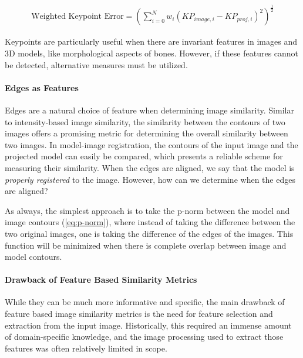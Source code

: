 \begin{equation}
    \begin{aligned}
        \text{Weighted Keypoint Error} = (\sum_{i = 0}^{N}w_{i}(KP_{image,i} - KP_{proj,i})^2)^{\frac{1}{2}}
    \end{aligned}
    \label{eq:wkp-error}
\end{equation}

Keypoints are particularly useful when there are invariant features in images and 3D models, like morphological aspects of bones.
However, if these features cannot be detected, alternative measures must be utilized.

\paragraph*{Edges as Features}
Edges are a natural choice of feature when determining image similarity.
Similar to intensity-based image similarity, the similarity between the contours of two images offers a promising metric for determining the overall similarity between two images.
In model-image registration, the contours of the input image and the projected model can easily be compared, which presents a reliable scheme for measuring their similarity.
When the edges are aligned, we say that the model is \textit{properly registered} to the image.
However, how can we determine when the edges are aligned?

As always, the simplest approach is to take the p-norm between the model and image contours (\cref{eq:p-norm}), where instead of taking the difference between the two original images, one is taking the difference of the edges of the images.
This function will be minimized when there is complete overlap between image and model contours.

\paragraph{Drawback of Feature Based Similarity Metrics}
While they can be much more informative and specific, the main drawback of feature based image similarity metrics is the need for feature selection and extraction from the input image.
Historically, this required an immense amount of domain-specific knowledge, and the image processing used to extract those features was often relatively limited in scope.


